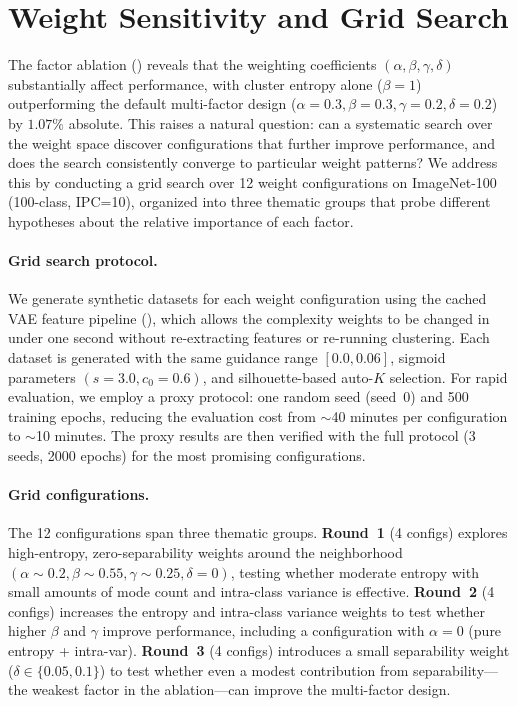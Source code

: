 \section{Weight Sensitivity and Grid Search}
\label{sec:weight-learning}

The factor ablation () reveals that the weighting coefficients $(\alpha, \beta, \gamma, \delta)$ substantially affect performance, with cluster entropy alone ($\beta{=}1$) outperforming the default multi-factor design ($\alpha{=}0.3, \beta{=}0.3, \gamma{=}0.2, \delta{=}0.2$) by $1.07\%$ absolute. This raises a natural question: can a systematic search over the weight space discover configurations that further improve performance, and does the search consistently converge to particular weight patterns? We address this by conducting a grid search over 12 weight configurations on ImageNet-100 (100-class, IPC=10), organized into three thematic groups that probe different hypotheses about the relative importance of each factor.

\paragraph{Grid search protocol.}
We generate synthetic datasets for each weight configuration using the cached VAE feature pipeline (), which allows the complexity weights to be changed in under one second without re-extracting features or re-running clustering. Each dataset is generated with the same guidance range $[0.0, 0.06]$, sigmoid parameters $(s{=}3.0, c_0{=}0.6)$, and silhouette-based auto-$K$ selection. For rapid evaluation, we employ a proxy protocol: one random seed (seed~0) and 500 training epochs, reducing the evaluation cost from $\sim$40 minutes per configuration to $\sim$10 minutes. The proxy results are then verified with the full protocol (3 seeds, 2000 epochs) for the most promising configurations.

\paragraph{Grid configurations.}
The 12 configurations span three thematic groups. \textbf{Round~1} (4 configs) explores high-entropy, zero-separability weights around the neighborhood $(\alpha{\sim}0.2, \beta{\sim}0.55, \gamma{\sim}0.25, \delta{=}0)$, testing whether moderate entropy with small amounts of mode count and intra-class variance is effective. \textbf{Round~2} (4 configs) increases the entropy and intra-class variance weights to test whether higher $\beta$ and $\gamma$ improve performance, including a configuration with $\alpha{=}0$ (pure entropy + intra-var). \textbf{Round~3} (4 configs) introduces a small separability weight ($\delta \in \{0.05, 0.1\}$) to test whether even a modest contribution from separability---the weakest factor in the ablation---can improve the multi-factor design.


